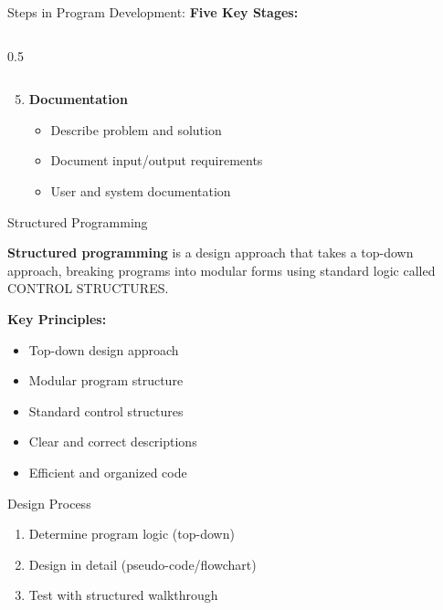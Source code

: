 \documentclass[aspectratio=169]{beamer}
\begin{document}
\begin{frame}{Steps in Program Development: \textbf{Five Key Stages:}}
\begin{columns}
\begin{column}{0.5\textwidth}
\begin{enumerate}
         
    \end{enumerate}
    
    \end{column}
    
    \end{columns}
    \begin{enumerate}
         \setcounter{enumi}{4}
        \item {} \textbf{Documentation}
        \begin{itemize}
            \item Describe problem and solution
            \item Document input/output requirements
            \item User and system documentation
        \end{itemize}
    \end{enumerate}
    
\end{frame}
 

\begin{frame}{Structured Programming}
    \begin{definition}
        \textbf{Structured programming} is a design approach that takes a top-down approach, breaking programs into modular forms using standard logic called CONTROL STRUCTURES.
    \end{definition} 
    
    \textbf{Key Principles:}
    \begin{itemize}
        \item Top-down design approach
        \item Modular program structure
        \item Standard control structures
        \item Clear and correct descriptions
        \item Efficient and organized code
    \end{itemize}
    
    \begin{exampleblock}{Design Process}
        \begin{enumerate}
            \item Determine program logic (top-down)
            \item Design in detail (pseudo-code/flowchart)
            \item Test with structured walkthrough
        \end{enumerate}
    \end{exampleblock}
\end{frame}
\end{document}
